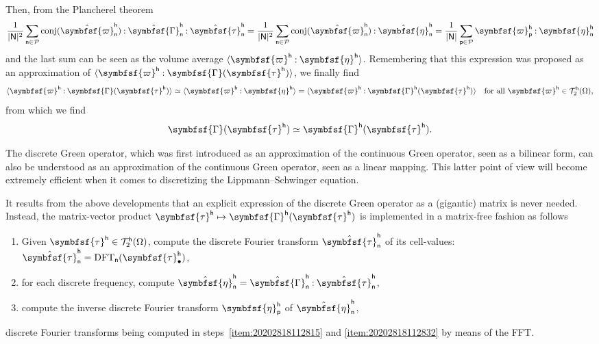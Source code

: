 \documentclass[draft, appendixprefix=true, chapterprefix=true, fontsize=12pt, numbers=noendperiod]{scrbook}
\newcommand{\cellindices}{\mathcal P}
\DeclareMathOperator{\conj}{conj}
\newcommand{\dbldot}{\mathbin{\mathord{:}}}
\DeclareMathOperator{\dft}{DFT}
\newcommand{\tens}[1]{\symbfsf{#1}}
\newcommand{\tensors}{\mathcal T}
\newcommand{\tuple}[1]{\mathsf{#1}}
\begin{document}
Then, from the Plancherel theorem
\begin{equation}
  \frac1{\lvert\tuple N\rvert^2}
  \sum_{\tuple n\in\cellindices}\conj(\hat{\tens\varpi}_{\tuple n}^{\tuple h})
  \dbldot\hat{\tens\Gamma}_{\tuple n}^{\tuple h}\dbldot
  \hat{\tens\tau}_{\tuple n}^{\tuple h}=\frac1{\lvert\tuple N\rvert^2}
  \sum_{\tuple n\in\cellindices}\conj(\hat{\tens\varpi}_{\tuple n}^{\tuple h})
  \dbldot\hat{\tens\eta}_{\tuple n}^{\tuple h}=\frac1{\lvert\tuple N\rvert}
  \sum_{\tuple p\in\cellindices}\tens\varpi_{\tuple p}^{\tuple h}
  \dbldot\tens\eta_{\tuple n}^{\tuple h}
\end{equation}
and the last sum can be seen as the volume average
\(\langle\tens\varpi^{\tuple h}\dbldot\tens\eta^{\tuple
  h}\rangle\). Remembering that this expression was proposed as an
approximation of
\(\langle\tens\varpi^{\tuple h}\dbldot\tens\Gamma(\tens\tau^{\tuple h})\rangle\),
we finally find
\begin{equation}
  \langle\tens\varpi^{\tuple h}\dbldot\tens\Gamma(\tens\tau^{\tuple h})\rangle\simeq\langle\tens\varpi^{\tuple h}\dbldot\tens\eta^{\tuple h}\rangle=\langle\tens\varpi^{\tuple h}\dbldot\tens\Gamma^{\tuple h}(\tens\tau^{\tuple h})\rangle\quad\text{for all }\tens\varpi^{\tuple h}\in\tensors_2^{\tuple h}(\Omega),
\end{equation}
from which we find
\begin{equation}
  \tens\Gamma(\tens\tau^{\tuple h})\simeq\tens\Gamma^{\tuple h}
  (\tens\tau^{\tuple h}).
\end{equation}

The discrete Green operator, which was first introduced as an approximation of
the continuous Green operator, seen as a bilinear form, can also be understood
as an approximation of the continuous Green operator, seen as a linear
mapping. This latter point of view will become extremely efficient when it
comes to discretizing the Lippmann--Schwinger equation.

It results from the above developments that an explicit expression of the
discrete Green operator as a (gigantic) matrix is never needed. Instead, the
matrix-vector product
\(\tens\tau^{\tuple h}\mapsto\tens\Gamma^{\tuple h}(\tens\tau^{\tuple h})\) is
implemented in a matrix-free fashion as follows
\begin{enumerate}
\item\label{item:20202818112815} Given
  \(\tens\tau^{\tuple h}\in\tensors_2^{\tuple h}(\Omega)\), compute the
  discrete Fourier transform \(\hat{\tens\tau}_{\tuple n}^{\tuple h}\) of its
  cell-values:
  \(\hat{\tens\tau}_{\tuple n}^{\tuple h}=\dft_{\tuple
    n}(\tens\tau_\bullet^{\tuple h})\),
\item for each discrete frequency, compute
  \(\hat{\tens\eta}_{\tuple n}^{\tuple h}=\hat{\tens\Gamma}_{\tuple n}^{\tuple
    h}\dbldot\hat{\tens\tau}_{\tuple n}^{\tuple h}\),
\item\label{item:20202818112832} compute the inverse discrete Fourier transform
  \(\tens\eta_{\tuple{p}}^{\tuple h}\) of \(\hat{\tens\eta}_{\tuple{n}}^{\tuple h}\),
\end{enumerate}
discrete Fourier transforms being computed in steps~\ref{item:20202818112815}
and \ref{item:20202818112832} by means of the FFT.
\end{document}

